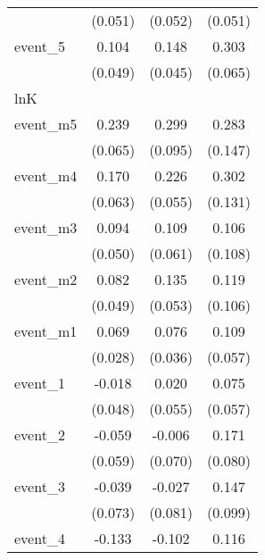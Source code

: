 {\begin{tabular}{l*{3}{c}}
            &     (0.051)         &     (0.052)         &     (0.051)         \\
[1em]
event\_5     &       0.104\sym{*}  &       0.148\sym{**} &       0.303\sym{***}\\
            &     (0.049)         &     (0.045)         &     (0.065)         \\
\hline
lnK         &                     &                     &                     \\
event\_m5    &       0.239\sym{***}&       0.299\sym{**} &       0.283         \\
            &     (0.065)         &     (0.095)         &     (0.147)         \\
[1em]
event\_m4    &       0.170\sym{**} &       0.226\sym{***}&       0.302\sym{*}  \\
            &     (0.063)         &     (0.055)         &     (0.131)         \\
[1em]
event\_m3    &       0.094         &       0.109         &       0.106         \\
            &     (0.050)         &     (0.061)         &     (0.108)         \\
[1em]
event\_m2    &       0.082         &       0.135\sym{*}  &       0.119         \\
            &     (0.049)         &     (0.053)         &     (0.106)         \\
[1em]
event\_m1    &       0.069\sym{*}  &       0.076\sym{*}  &       0.109         \\
            &     (0.028)         &     (0.036)         &     (0.057)         \\
[1em]
event\_1     &      -0.018         &       0.020         &       0.075         \\
            &     (0.048)         &     (0.055)         &     (0.057)         \\
[1em]
event\_2     &      -0.059         &      -0.006         &       0.171\sym{*}  \\
            &     (0.059)         &     (0.070)         &     (0.080)         \\
[1em]
event\_3     &      -0.039         &      -0.027         &       0.147         \\
            &     (0.073)         &     (0.081)         &     (0.099)         \\
[1em]
event\_4     &      -0.133         &      -0.102         &       0.116         \\

\end{tabular}}
